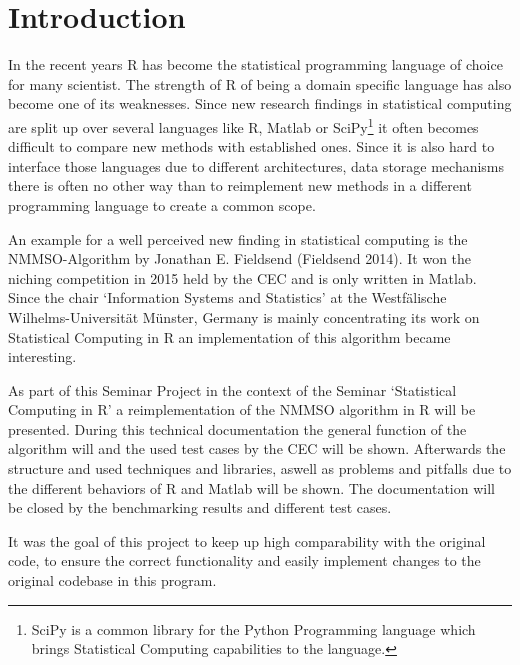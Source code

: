 \documentclass[12pt,a4paper]{article}
\begin{document}
\renewcommand\refname{References} %


\newpage
{} %
\tableofcontents
\newpage
\listoffigures

\newpage
{} %

\section{Introduction}\label{introduction}

In the recent years R has become the statistical programming language of
choice for many scientist. The strength of R of being a domain specific
language has also become one of its weaknesses. Since new research
findings in statistical computing are split up over several languages
like R, Matlab or SciPy\footnote{SciPy is a common library for the
  Python Programming language which brings Statistical Computing
  capabilities to the language. \newpage} it often becomes difficult to
compare new methods with established ones. Since it is also hard to
interface those languages due to different architectures, data storage
mechanisms there is often no other way than to reimplement new methods
in a different programming language to create a common scope.

An example for a well perceived new finding in statistical computing is
the NMMSO-Algorithm by Jonathan E. Fieldsend (Fieldsend 2014). It won
the niching competition in 2015 held by the CEC and is only written in
Matlab. Since the chair `Information Systems and Statistics' at the
Westfälische Wilhelms-Universität Münster, Germany is mainly
concentrating its work on Statistical Computing in R an implementation
of this algorithm became interesting.

As part of this Seminar Project in the context of the Seminar
`Statistical Computing in R' a reimplementation of the NMMSO algorithm
in R will be presented. During this technical documentation the general
function of the algorithm will and the used test cases by the CEC will
be shown. Afterwards the structure and used techniques and libraries,
aswell as problems and pitfalls due to the different behaviors of R and
Matlab will be shown. The documentation will be closed by the
benchmarking results and different test cases.

It was the goal of this project to keep up high comparability with the
original code, to ensure the correct functionality and easily implement
changes to the original codebase in this program.
\end{document}
